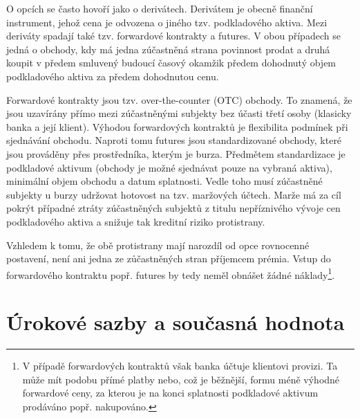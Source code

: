 \documentclass[a4paper]{book}
\begin{document}
O opcích se často hovoří jako o derivátech. Derivátem je obecně finanční instrument, jehož cena je odvozena o jiného tzv. podkladového aktiva. Mezi deriváty spadají také tzv. forwardové kontrakty a futures. V obou případech se jedná o obchody, kdy má jedna zúčastněná strana povinnost prodat a druhá koupit v předem smluvený budoucí časový okamžik předem dohodnutý objem podkladového aktiva za předem dohodnutou cenu.

Forwardové kontrakty jsou tzv. over-the-counter (OTC) obchody. To znamená, že jsou uzavírány přímo mezi zúčastněnými subjekty bez účasti třetí osoby (klasicky banka a její klient). Výhodou forwardových kontraktů je flexibilita podmínek při sjednávání obchodu. Naproti tomu futures jsou standardizované obchody, které jsou prováděny přes prostředníka, kterým je burza. Předmětem standardizace je podkladové aktivum (obchody je možné sjednávat pouze na vybraná aktiva), minimální objem obchodu a datum splatnosti. Vedle toho musí zúčastněné subjekty u burzy udržovat hotovost na tzv. maržových účtech. Marže má za cíl pokrýt případné ztráty zúčastněných subjektů z titulu nepříznivého vývoje cen podkladového aktiva a snižuje tak kreditní riziko protistrany.

Vzhledem k tomu, že obě protistrany mají narozdíl od opce rovnocenné postavení, není ani jedna ze zůčastněných stran příjemcem prémia. Vstup do forwardového kontraktu popř. futures by tedy neměl obnášet žádné náklady\footnote{V případě forwardových kontraktů však banka účtuje klientovi provizi. Ta může mít podobu přímé platby nebo, což je běžnější, formu méně výhodné forwardové ceny, za kterou je na konci splatnosti podkladové aktivum prodáváno popř. nakupováno.}.

\section{Úrokové sazby a současná hodnota}
\end{document}
